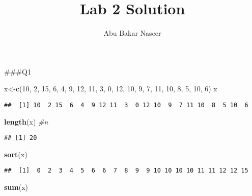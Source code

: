 \documentclass[]{article}
\title{Lab 2 Solution}
\author{Abu Bakar Naseer}
\date{}
\newenvironment{Shaded}{\begin{snugshade}}{\end{snugshade}}
\newcommand{\CommentTok}[1]{\textcolor[rgb]{0.56,0.35,0.01}{\textit{#1}}}
\newcommand{\DecValTok}[1]{\textcolor[rgb]{0.00,0.00,0.81}{#1}}
\newcommand{\KeywordTok}[1]{\textcolor[rgb]{0.13,0.29,0.53}{\textbf{#1}}}
\newcommand{\NormalTok}[1]{#1}
\begin{document}
\maketitle

\#\#\#Q1

\begin{Shaded}
\begin{Highlighting}[]
\NormalTok{x<-}\KeywordTok{c}\NormalTok{(}\DecValTok{10}\NormalTok{, }\DecValTok{2}\NormalTok{, }\DecValTok{15}\NormalTok{, }\DecValTok{6}\NormalTok{, }\DecValTok{4}\NormalTok{, }\DecValTok{9}\NormalTok{, }\DecValTok{12}\NormalTok{, }\DecValTok{11}\NormalTok{, }\DecValTok{3}\NormalTok{, }\DecValTok{0}\NormalTok{, }\DecValTok{12}\NormalTok{, }\DecValTok{10}\NormalTok{, }\DecValTok{9}\NormalTok{, }\DecValTok{7}\NormalTok{, }\DecValTok{11}\NormalTok{, }\DecValTok{10}\NormalTok{, }\DecValTok{8}\NormalTok{, }\DecValTok{5}\NormalTok{, }\DecValTok{10}\NormalTok{, }\DecValTok{6}\NormalTok{)}
\NormalTok{x}
\end{Highlighting}
\end{Shaded}

\begin{verbatim}
##  [1] 10  2 15  6  4  9 12 11  3  0 12 10  9  7 11 10  8  5 10  6
\end{verbatim}

\begin{Shaded}
\begin{Highlighting}[]
\KeywordTok{length}\NormalTok{(x) }\CommentTok{#n }
\end{Highlighting}
\end{Shaded}

\begin{verbatim}
## [1] 20
\end{verbatim}

\begin{Shaded}
\begin{Highlighting}[]
\KeywordTok{sort}\NormalTok{(x)}
\end{Highlighting}
\end{Shaded}

\begin{verbatim}
##  [1]  0  2  3  4  5  6  6  7  8  9  9 10 10 10 10 11 11 12 12 15
\end{verbatim}

\begin{Shaded}
\begin{Highlighting}[]
\KeywordTok{sum}\NormalTok{(x) }
\end{Highlighting}
\end{Shaded}
\end{document}
